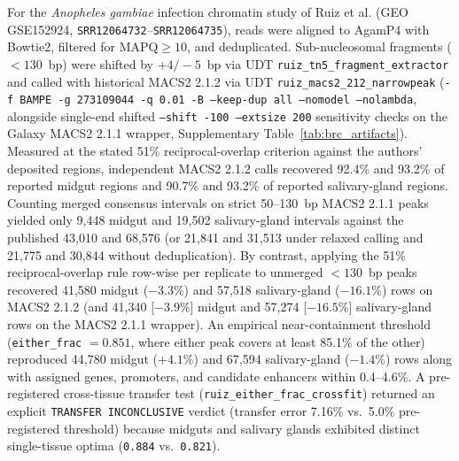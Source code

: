 \documentclass[11pt,letterpaper]{article}
\begin{document}
For the \textit{Anopheles gambiae} infection chromatin study of Ruiz et al. \cite{ruiz2021} (GEO GSE152924, \texttt{SRR12064732}--\texttt{SRR12064735}), reads were aligned to AgamP4 with Bowtie2, filtered for $\text{MAPQ} \ge 10$, and deduplicated. Sub-nucleosomal fragments ($< 130$~bp) were shifted by $+4/-5$~bp via UDT \texttt{ruiz\_tn5\_fragment\_extractor} and called with historical MACS2 2.1.2 via UDT \texttt{ruiz\_macs2\_212\_narrowpeak} (\texttt{-f BAMPE -g 273109044 -q 0.01 -B --keep-dup all --nomodel --nolambda}, alongside single-end shifted \texttt{--shift -100 --extsize 200} sensitivity checks on the Galaxy MACS2 2.1.1 wrapper, Supplementary Table~\ref{tab:brc_artifacts}). Measured at the stated 51\% reciprocal-overlap criterion against the authors' deposited regions, independent MACS2 2.1.2 calls recovered 92.4\% and 93.2\% of reported midgut regions and 90.7\% and 93.2\% of reported salivary-gland regions. Counting merged consensus intervals on strict 50--130~bp MACS2 2.1.1 peaks yielded only 9,448 midgut and 19,502 salivary-gland intervals against the published 43,010 and 68,576 (or 21,841 and 31,513 under relaxed calling and 21,775 and 30,844 without deduplication). By contrast, applying the 51\% reciprocal-overlap rule row-wise per replicate to unmerged $< 130$~bp peaks recovered 41,580 midgut ($-3.3\%$) and 57,518 salivary-gland ($-16.1\%$) rows on MACS2 2.1.2 (and 41,340 [$-3.9\%$] midgut and 57,274 [$-16.5\%$] salivary-gland rows on the MACS2 2.1.1 wrapper). An empirical near-containment threshold (\texttt{either\_frac} $= 0.851$, where either peak covers at least 85.1\% of the other) reproduced 44,780 midgut ($+4.1\%$) and 67,594 salivary-gland ($-1.4\%$) rows along with assigned genes, promoters, and candidate enhancers within 0.4--4.6\%. A pre-registered cross-tissue transfer test (\texttt{ruiz\_either\_frac\_crossfit}) returned an explicit \texttt{TRANSFER INCONCLUSIVE} verdict (transfer error 7.16\% vs.\ 5.0\% pre-registered threshold) because midguts and salivary glands exhibited distinct single-tissue optima (\texttt{0.884} vs.\ \texttt{0.821}).
\end{document}
